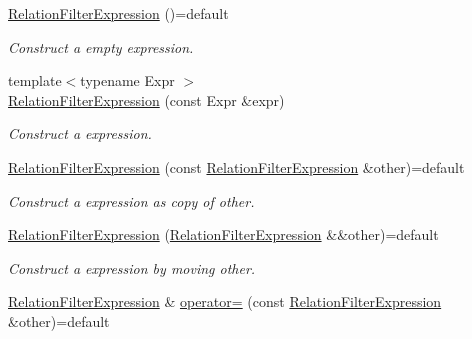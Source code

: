 \begin{DoxyCompactItemize}
\item 
\hyperlink{class_mdt_1_1_item_model_1_1_relation_filter_expression_a7f0fa4a5e3bef21405f94f241a9ae88c}{Relation\+Filter\+Expression} ()=default\hypertarget{class_mdt_1_1_item_model_1_1_relation_filter_expression_a7f0fa4a5e3bef21405f94f241a9ae88c}{}\label{class_mdt_1_1_item_model_1_1_relation_filter_expression_a7f0fa4a5e3bef21405f94f241a9ae88c}

\begin{DoxyCompactList}\small\item\em Construct a empty expression. \end{DoxyCompactList}\item 
{\footnotesize template$<$typename Expr $>$ }\\\hyperlink{class_mdt_1_1_item_model_1_1_relation_filter_expression_a2cca7170a17aed9cbf525b166e25bd6b}{Relation\+Filter\+Expression} (const Expr \&expr)
\begin{DoxyCompactList}\small\item\em Construct a expression. \end{DoxyCompactList}\item 
\hyperlink{class_mdt_1_1_item_model_1_1_relation_filter_expression_aa3e0d21e5161766954fd23beb132044a}{Relation\+Filter\+Expression} (const \hyperlink{class_mdt_1_1_item_model_1_1_relation_filter_expression}{Relation\+Filter\+Expression} \&other)=default\hypertarget{class_mdt_1_1_item_model_1_1_relation_filter_expression_aa3e0d21e5161766954fd23beb132044a}{}\label{class_mdt_1_1_item_model_1_1_relation_filter_expression_aa3e0d21e5161766954fd23beb132044a}

\begin{DoxyCompactList}\small\item\em Construct a expression as copy of other. \end{DoxyCompactList}\item 
\hyperlink{class_mdt_1_1_item_model_1_1_relation_filter_expression_a4fa01cab2a92f76b8d2a097b4cc1ac30}{Relation\+Filter\+Expression} (\hyperlink{class_mdt_1_1_item_model_1_1_relation_filter_expression}{Relation\+Filter\+Expression} \&\&other)=default\hypertarget{class_mdt_1_1_item_model_1_1_relation_filter_expression_a4fa01cab2a92f76b8d2a097b4cc1ac30}{}\label{class_mdt_1_1_item_model_1_1_relation_filter_expression_a4fa01cab2a92f76b8d2a097b4cc1ac30}

\begin{DoxyCompactList}\small\item\em Construct a expression by moving other. \end{DoxyCompactList}\item 
\hyperlink{class_mdt_1_1_item_model_1_1_relation_filter_expression}{Relation\+Filter\+Expression} \& \hyperlink{class_mdt_1_1_item_model_1_1_relation_filter_expression_a674264fbd807b4294974f1c3f7fb6c3d}{operator=} (const \hyperlink{class_mdt_1_1_item_model_1_1_relation_filter_expression}{Relation\+Filter\+Expression} \&other)=default\hypertarget{class_mdt_1_1_item_model_1_1_relation_filter_expression_a674264fbd807b4294974f1c3f7fb6c3d}{}\label{class_mdt_1_1_item_model_1_1_relation_filter_expression_a674264fbd807b4294974f1c3f7fb6c3d}


\end{DoxyCompactItemize}
